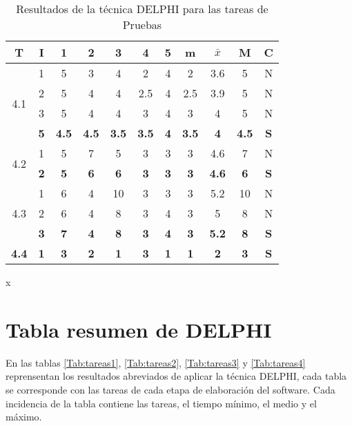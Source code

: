\documentclass[11pt,a4paper,spanish,twoside]{report}
\begin{document}
\begin{table}[!h]
\centering
  \begin{tabular}{|c|c||c|c|c|c|c||c|c|c||c|}
    \hline
    \textbf{T} & \textbf{I} & \textbf{1} &
    \textbf{2} & \textbf{3} & \textbf{4} & \textbf{5} & \textbf{m}
    &\textbf{$\bar{x}$} &\textbf{M} & \textbf{C}\\    
    \hline \hline
    \multirow{4}{*}{4.1}& 1 & 5 & 3 & 4 & 2 & 4 & 2 & 3.6 & 5 & N \\
    & 2 & 5 & 4 & 4 & 2.5 & 4 & 2.5 & 3.9 & 5 & N \\
    & 3 & 5 & 4 & 4 & 3 & 4 & 3 & 4 & 5 & N \\
    & \textbf{5} & \textbf{4.5} & \textbf{4.5} & \textbf{3.5} & \textbf{3.5} & \textbf{4} & \textbf{3.5} & \textbf{4} & \textbf{4.5} & \textbf{S} \\    
    \hline
    
    \multirow{2}{*}{4.2}& 1 & 5 & 7 & 5 & 3 & 3 & 3 & 4.6 & 7 & N \\
    & \textbf{2} & \textbf{5} & \textbf{6} & \textbf{6} & \textbf{3} & \textbf{3} & \textbf{3} & \textbf{4.6} & \textbf{6} & \textbf{S} \\
    \hline
    \multirow{3}{*}{4.3}& 1 & 6 & 4 & 10 & 3 & 3 & 3 & 5.2 & 10 & N \\
    & 2 & 6 & 4 & 8 & 3 & 4 & 3 & 5 & 8 & N \\
    & \textbf{3} & \textbf{7} & \textbf{4} & \textbf{8} & \textbf{3} & \textbf{4} & \textbf{3} & \textbf{5.2} & \textbf{8} & \textbf{S} \\
    \hline
    \textbf{4.4} & \textbf{1} & \textbf{3} & \textbf{2} & \textbf{1} & \textbf{3} & \textbf{1} & \textbf{1} & \textbf{2} & \textbf{3} & \textbf{S} \\
    \hline
  \end{tabular}
  \caption{Resultados de la técnica DELPHI para las tareas de Pruebas} x\label{Tab:pru}
\end{table} 
\section{Tabla resumen de DELPHI}
En las tablas \ref{Tab:tareas1}, \ref{Tab:tareas2}, \ref{Tab:tareas3} y
\ref{Tab:tareas4} reprensentan los resultados abreviados de aplicar la
técnica DELPHI, cada tabla se corresponde con las tareas de cada etapa de
elaboración del software. Cada incidencia de la tabla contiene las tareas, el
tiempo mínimo, el medio y el máximo.
\end{document}
